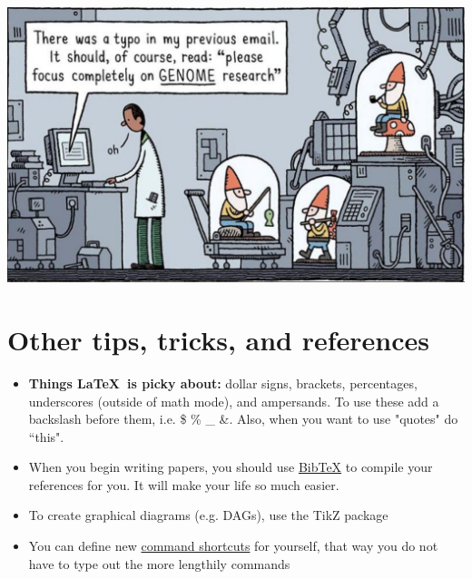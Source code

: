 \documentclass[11pt, oneside]{article}
\begin{document}
\begin{center}
\includegraphics[scale=.5]{image}
\end{center}

\section{Other tips, tricks, and references}

\begin{itemize}
	\item \textbf{Things \LaTeX \ is picky about:} dollar signs, brackets, percentages, underscores (outside of math mode), and ampersands. To use these add a backslash before them, i.e. \$ \% \_ \&. Also, when you want to use "quotes" do ``this".
	\item When you begin writing papers, you should use \href{http://www.bibtex.org/}{BibTeX} to compile your references for you. It will make your life so much easier.  
	\item To create graphical diagrams (e.g. DAGs), use the TikZ package
	\item You can define new  \href{https://www.sharelatex.com/learn/Commands#Defining_a_new_command}{command shortcuts} for yourself, that way you do not have to type out the more lengthily commands
\end{itemize}
\end{document}
